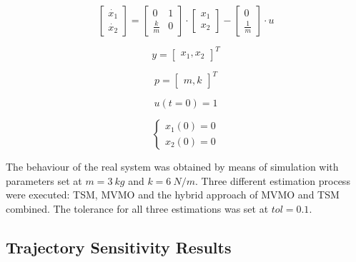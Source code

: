 \begin{equation}
	\begin{bmatrix}
		\dot{x_{1}} \\
		\dot{x_{2}}
	\end{bmatrix} = 
	\begin{bmatrix}
		0 & 1 \\
		\frac{k}{m} & 0
	\end{bmatrix}\cdot
	\begin{bmatrix}
		x_{1} \\
		x_{2}
	\end{bmatrix} -
	\begin{bmatrix}
		0 \\
		\frac{1}{m}
	\end{bmatrix}
	\cdot
	u
	\label{eq: SpringMass}
\end{equation}

\begin{equation}
	y = \begin{bmatrix}
		x_{1}, x_{2}
	\end{bmatrix}^ {T}
	\label{eq: SMoutput}
\end{equation}

\begin{equation}
	p = \begin{bmatrix}
		m, k
	\end{bmatrix}^ {T}
	\label{eq: SMp}
\end{equation}

\begin{equation}
	u(t = 0) = 1
	\label{eq: SMinput}
\end{equation}

\begin{equation}
	\begin{cases}
		x_{1}(0) = 0 \\
		x_{2}(0) = 0
	\end{cases}
	\label{eq: SMinitcond}
\end{equation}

The behaviour of the real system was obtained by means of simulation with parameters set at $m = 3\ kg$ and $k = 6\ N/m$. Three different estimation process were executed: TSM, MVMO and the hybrid approach of MVMO and TSM combined. The tolerance for all three estimations was set at $tol = 0.1$.

\subsection{Trajectory Sensitivity Results}

